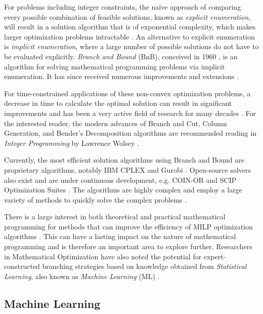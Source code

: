 For problems including integer constraints, the na\"ive approach of comparing every possible combination of feasible solutions, known as \textit{explicit enumeration}, will result in a solution algorithm that is of exponential complexity, which makes larger optimization problems intractable \cite{wolsey2020integer}. An alternative to explicit enumeration is \textit{implicit enumeration}, where a large number of possible solutions do not have to be evaluated explicitly. 
\textit{Branch and Bound} (\gls{BnB}), conceived in 1960 \cite{land1960automatic}, is an algorithm for solving mathematical programming problems via implicit enumeration. It has since received numerous improvements and extensions \cite{wolsey2020integer}. 

For time-constrained applications of these non-convex optimization problems, a decrease in time to calculate the optimal solution can result in significant improvements and has been a very active field of research for many decades \cite{wolsey2020integer}. For the interested reader, the modern advances of Branch and Cut, Column Generation, and Bender's Decomposition algorithms are recommended reading in \textit{Integer Programming} by Lawrence Wolsey \cite{wolsey2020integer}.

Currently, the most efficient solution algorithms using Branch and Bound are proprietary algorithms, notably IBM CPLEX and Gurobi \cite{anand2017comparative}. Open-source solvers also exist and are under continuous development, e.g. \gls{COIN-OR} and \gls{SCIP} Optimization Suites \cite{achterberg2009scip,anand2017comparative}. The algorithms are highly complex and employ a large variety of methods to quickly solve the complex problems \cite{wolsey2020integer}. 

There is a large interest in both theoretical and practical mathematical programming for methods that can improve the efficiency of \gls{MILP} optimization algorithms \cite{wolsey2020integer}. This can have a lasting impact on the nature of mathematical programming and is therefore an important area to explore further. Researchers in Mathematical Optimization have also noted the potential for expert-constructed branching strategies based on knowledge obtained from \textit{Statistical Learning}, also known as \textit{Machine Learning} (\Gls{ML}) \cite{lodi2017learning}.




\subsection{Machine Learning}

